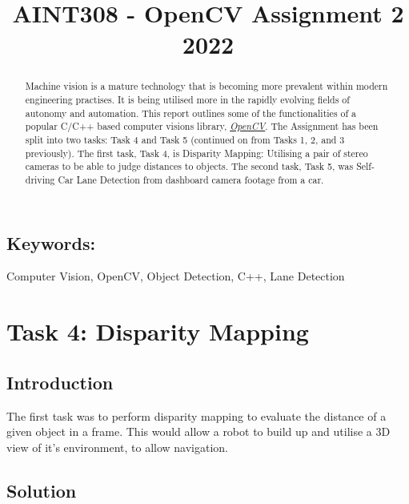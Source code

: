 \documentclass[conference]{IEEEtran}
\begin{document}
\title{AINT308 - OpenCV Assignment 2 2022}

\author{
}

\maketitle

\begin{abstract}

Machine vision is a mature technology that is becoming more prevalent within modern engineering practises. It is being utilised more in the rapidly evolving fields of autonomy and automation. This report outlines some of the functionalities of a popular C/C++ based computer visions library, \href{https://opencv.org}{\textit{OpenCV}}. The Assignment has been split into two tasks: Task 4 and Task 5 (continued on from Tasks 1, 2, and 3 previously). The first task, Task 4, is Disparity Mapping: Utilising a pair of stereo cameras to be able to judge distances to objects. The second task, Task 5, was Self-driving Car Lane Detection from dashboard camera footage from a car.

\end{abstract}

\subsection*{Keywords:} 
Computer Vision, OpenCV, Object Detection, C++, Lane Detection

\section{Task 4: Disparity Mapping}	
\subsection{Introduction}

The first task was to perform disparity mapping to evaluate the distance of a given object in a frame. This would allow a robot to build up and utilise a 3D view of it's environment, to allow navigation. 

\subsection{Solution}
\end{document}
